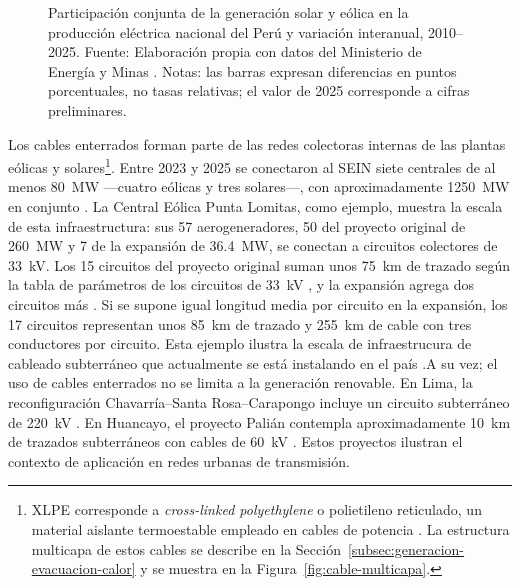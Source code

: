 \begin{figure}[htbp]
\caption[Participación de la generación solar y eólica en el Perú]{Participación conjunta de la generación solar y eólica en la producción eléctrica nacional del Perú y variación interanual, 2010--2025. Fuente: Elaboración propia con datos del Ministerio de Energía y Minas \parencites[sec.~10.4]{minem2025anuario2024}[cuadro~4]{minem2025indicadoresDiciembre}. Notas: las barras expresan diferencias en puntos porcentuales, no tasas relativas; el valor de 2025 corresponde a cifras preliminares.}
\label{fig:participacion-renovable-peru}
\end{figure}

Los cables enterrados forman parte de las redes colectoras internas de las plantas eólicas y solares\footnote{XLPE corresponde a \textit{cross-linked polyethylene} o polietileno reticulado, un material aislante termoestable empleado en cables de potencia \parencites[9--10]{thue1999electrical}{iec60502_2_2014}. La estructura multicapa de estos cables se describe en la Sección~\ref{subsec:generacion-evacuacion-calor} y se muestra en la Figura~\ref{fig:cable-multicapa}.}. Entre 2023 y 2025 se conectaron al SEIN siete centrales de al menos \SI{80}{\mega\watt} ---cuatro eólicas y tres solares---, con aproximadamente \SI{1250}{\mega\watt} en conjunto \parencites{osinergmin2024puntaLomitas}{minem2024nuevasRER}{minem2025nuevasCentrales}. La Central Eólica Punta Lomitas, como ejemplo, muestra la escala de esta infraestructura: sus 57 aerogeneradores, 50 del proyecto original de \SI{260}{\mega\watt} y 7 de la expansión de \SI{36.4}{\mega\watt}, se conectan a circuitos colectores de \SI{33}{\kilo\volt}. Los 15 circuitos del proyecto original suman unos \SI{75}{\kilo\metre} de trazado según la tabla de parámetros de los circuitos de \SI{33}{\kilo\volt} \parencite{coes2021puntaLomitasEO}, y la expansión agrega dos circuitos más \parencite{coes2022puntaLomitasExpansion}. Si se supone igual longitud media por circuito en la expansión, los 17 circuitos representan unos \SI{85}{\kilo\metre} de trazado y \SI{255}{\kilo\metre} de cable con tres conductores por circuito. Esta ejemplo ilustra la escala de infraestrucura de cableado subterráneo que actualmente se está instalando en el país \parencite{engie2023puntaLomitas}.A su vez; el uso de cables enterrados no se limita a la generación renovable. En Lima, la reconfiguración Chavarría--Santa Rosa--Carapongo incluye un circuito subterráneo de \SI{220}{\kilo\volt} \parencite[13]{coes2022planTransmision2023_2032}. En Huancayo, el proyecto Palián contempla aproximadamente \SI{10}{\kilo\metre} de trazados subterráneos con cables de \SI{60}{\kilo\volt} \parencites[168]{coes2022planTransmision2023_2032}[3,55--56]{proinversion2026palian}. Estos proyectos ilustran el contexto de aplicación en redes urbanas de transmisión.

